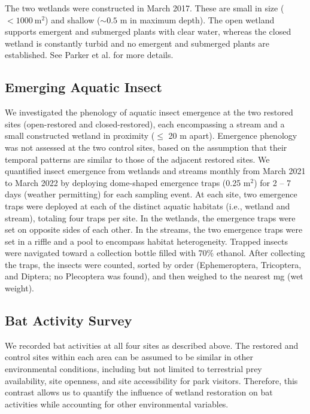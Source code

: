 \documentclass[11pt, class=article, crop=false]{standalone}
\begin{document}
The two wetlands were constructed in March 2017.
These are small in size ($< 1000~\text{m}^2$) and shallow ($\sim 0.5$ m in maximum depth). 
The open wetland supports emergent and submerged plants with clear water, whereas the closed wetland is constantly turbid and no emergent and submerged plants are established.
See Parker et al. \citeyear{parker_rapid_2019} for more details.

\subsection{Emerging Aquatic Insect}

We investigated the phenology of aquatic insect emergence at the two restored sites (open-restored and closed-restored), each encompassing a stream and a small constructed wetland in proximity ($\le$ 20 m apart).
Emergence phenology was not assessed at the two control sites, based on the assumption that their temporal patterns are similar to those of the adjacent restored sites.
We quantified insect emergence from wetlands and streams monthly from March 2021 to March 2022 by deploying dome-shaped emergence traps (0.25 m$^2$) for 2 -- 7 days (weather permitting) for each sampling event.
At each site, two emergence traps were deployed at each of the distinct aquatic habitats (i.e., wetland and stream), totaling four traps per site.
In the wetlands, the emergence traps were set on opposite sides of each other.
In the streams, the two emergence traps were set in a riffle and a pool to encompass habitat heterogeneity.
Trapped insects were navigated toward a collection bottle filled with 70\% ethanol.
After collecting the traps, the insects were counted, sorted by order (Ephemeroptera, Tricoptera, and Diptera; no Plecoptera was found), and then weighed to the nearest mg (wet weight).

\subsection{Bat Activity Survey}

We recorded bat activities at all four sites as described above.
The restored and control sites within each area can be assumed to be similar in other environmental conditions, including but not limited to terrestrial prey availability, site openness, and site accessibility for park visitors.
Therefore, this contrast allows us to quantify the influence of wetland restoration on bat activities while accounting for other environmental variables.
\end{document}
